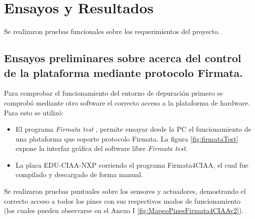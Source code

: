 
\chapter{Ensayos y Resultados} %

\label{Chapter4} %


Se realizaron pruebas funcionales sobre los requerimientos del proyecto.

\section{Ensayos preliminares sobre acerca del control de la plataforma mediante protocolo Firmata.}
\label{sec:Ensayos de control de la plataforma mediante protocolo Firmata}

Para comprobar el funcionamiento del entorno de depuración primero se comprobó mediante otro software el correcto acceso a la plataforma de hardware. Para esto se utilizó:

\begin{itemize}
	\item El programa \emph{Firmata test} \citep{firmataTest}, permite ensayar desde la PC el funcionamiento de una plataforma que soporte protocolo Firmata. La figura \ref{fig:firmataTest} expone la interfaz gráfica del software libre \emph{Firmata test}.
	\item La placa EDU-CIAA-NXP corriendo el programa Firmata4CIAA, el cual fue compilado y descargado de forma manual.
\end{itemize}

Se realizaron pruebas puntuales sobre los sensores y actuadores, demostrando el correcto acceso a todos los pines con sus respectivos modos de funcionamiento (los cuales pueden observarse en el Anexo I \ref{fig:MapeoPinesFirmata4CIAAv2}). 

